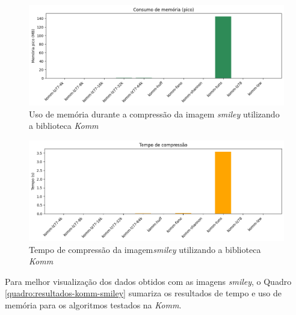 \begin{figure}[ht]
	\centering
	\caption{Uso de memória durante a compressão da imagem \textit{smiley} utilizando a biblioteca \textit{Komm}}
	\label{fig:fig:komm-smiley-memory}
	\includegraphics[width=15cm]{figuras/komm_smiley_memory.png}
\end{figure}

\begin{figure}[ht]
	\centering
	\caption{Tempo de compressão da imagem\textit{smiley} utilizando a biblioteca \textit{Komm}}
	\label{fig:fig:komm-smiley-time}
	\includegraphics[width=15cm]{figuras/komm_smiley_time.png}
\end{figure}

Para melhor visualização dos dados obtidos com as imagens \textit{smiley}, o Quadro \ref{quadro:resultados-komm-smiley} sumariza os resultados de tempo e uso de memória para os algoritmos testados na \textit{Komm}.

